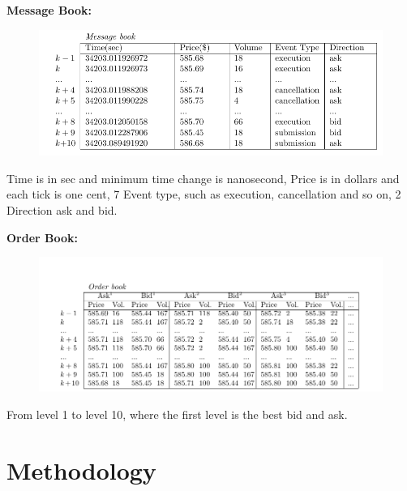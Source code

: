 \documentclass[xcolor={x11names,svgnames,dvipsnames}]{beamer}
\begin{document}
\begin{frame}
\textbf{Message Book:}
 \begin{figure}
     \includegraphics[width=1\textwidth, height=0.5\textheight]{message_book.png}
\end{figure}
Time is in sec and minimum time change is \alert{nanosecond}, Price is in dollars and each tick is one cent, 7 Event type, such as execution, cancellation and so on, 2 Direction ask and bid. 
\end{frame}


\begin{frame}
	\textbf{Order Book:}
	\begin{figure}
		\includegraphics[width=1\textwidth, height=0.5\textheight]{order_book.png}
	\end{figure}
From level \alert{1 to level 10}, where the first level is the best bid and ask.	
\end{frame}



\section{Methodology}
\end{document}
